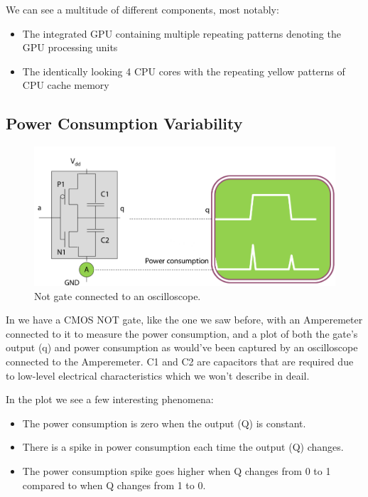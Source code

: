 We can see a multitude of different components, most notably:
\begin{itemize}
    \item The integrated GPU containing multiple repeating patterns denoting the GPU processing units
    \item The identically looking 4 CPU cores with the repeating yellow patterns of CPU cache memory
\end{itemize}

\subsection {Power Consumption Variability}

\begin{figure}[!ht]
    \centering
    \includegraphics[width=1.0\linewidth]{images/chapter4/not-gate-with-power-consumption-plot.png}
    \caption{Not gate connected to an oscilloscope.} \label{fig:Not gate connected to an oscilloscope}
\end{figure}

In  we have a CMOS NOT gate, like the one we saw before, with an Amperemeter connected to it to measure the power consumption, and a plot of both the gate's output (q) and power consumption as would've been captured by an oscilloscope connected to the Amperemeter.
C1 and C2 are capacitors that are required due to low-level electrical characteristics which we won't describe in deail.

In the plot we see a few interesting phenomena:
\begin{itemize}
    \item The power consumption is zero when the output (Q) is constant.
    \item There is a spike in power consumption each time the output (Q) changes.
    \item The power consumption spike goes higher when Q changes from 0 to 1 compared to when Q changes from 1 to 0.
\end{itemize}

